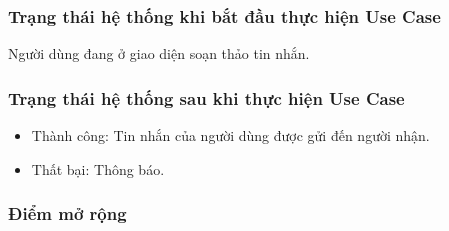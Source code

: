\subsubsection{Trạng thái hệ thống khi bắt đầu thực hiện Use Case}
Người dùng đang ở giao diện soạn thảo tin nhắn.

\subsubsection{Trạng thái hệ thống sau khi thực hiện Use Case}
\begin{itemize}
  \item Thành công: Tin nhắn của người dùng được gửi đến người nhận.
  \item Thất bại: Thông báo.
\end{itemize}

\subsubsection{Điểm mở rộng}